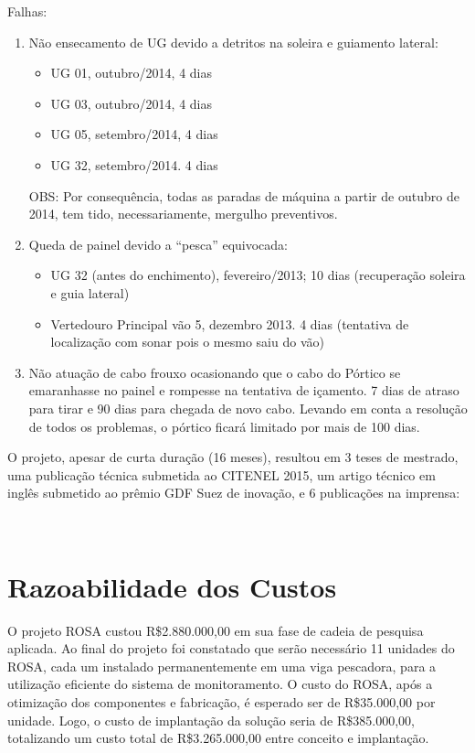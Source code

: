 Falhas:
\begin{enumerate}
  \item Não ensecamento de UG devido a detritos na soleira e guiamento lateral:
  		\begin{itemize}
  		  \item UG 01, outubro/2014, 4 dias
  		  \item UG 03, outubro/2014, 4 dias
  		  \item UG 05, setembro/2014, 4 dias
  		  \item UG 32, setembro/2014. 4 dias	
  		\end{itemize}
  		OBS: Por consequência, todas as paradas de máquina a partir de
  		outubro de 2014, tem tido, necessariamente, mergulho
  		preventivos. 
  \item Queda de painel devido a “pesca” equivocada:
  		\begin{itemize}
  		  \item UG 32 (antes do enchimento), fevereiro/2013; 10 dias (recuperação
  		  soleira e guia lateral)
  		  \item Vertedouro Principal vão 5, dezembro 2013. 4 dias (tentativa de
  		  localização com sonar pois o mesmo saiu do vão)
  		\end{itemize}
  \item Não atuação de cabo frouxo ocasionando que o cabo do Pórtico se
  emaranhasse no painel e rompesse na tentativa de içamento. 7 dias de atraso 
  para tirar e 90 dias para chegada de novo cabo. Levando em conta a resolução 
  de todos os problemas, o pórtico ficará limitado por mais de 100 dias.
\end{enumerate}

O projeto, apesar de curta duração (16 meses), resultou em 3 teses de 
mestrado, uma publicação técnica submetida ao CITENEL 2015, um artigo técnico 
em inglês submetido ao prêmio GDF Suez de inovação, e 6 publicações na imprensa: 

 
     
\section{Razoabilidade dos Custos}
O projeto ROSA custou R\$2.880.000,00 em sua fase de cadeia de pesquisa
aplicada. Ao final do projeto foi constatado que serão necessário 11 unidades 
do ROSA, cada um instalado permanentemente em uma viga pescadora, para a
utilização eficiente do sistema de monitoramento. O custo do ROSA, após a
otimização dos componentes e fabricação, é esperado ser de R\$35.000,00 por
unidade. Logo, o custo de implantação da solução seria de R\$385.000,00,
totalizando um custo total de R\$3.265.000,00 entre conceito e implantação.

